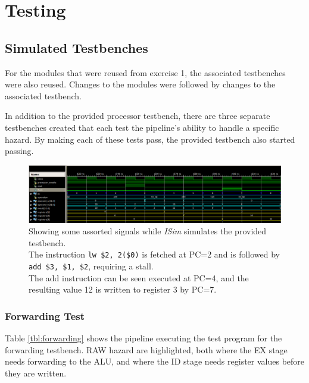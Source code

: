 \section{Testing}
\subsection{Simulated Testbenches}
For the modules that were reused from exercise 1,
the associated testbenches were also reused.
Changes to the modules were followed by changes to the associated testbench.

In addition to the provided processor testbench,
there are three separate testbenches created that each test the pipeline's ability to handle a specific hazard.
By making each of these tests pass, the provided testbench also started passing.

\begin{figure}[h]
    \centering
    \includegraphics[width=\textwidth]{img/isim}
    \caption{Showing some assorted signals while \textit{ISim} simulates the provided testbench.\\
        The instruction \texttt{lw \$2, 2(\$0)} is fetched at PC=2 and is followed by \texttt{add \$3, \$1, \$2},
        requiring a stall.\\
        The add instruction can be seen executed at PC=4,
         and the resulting value 12 is written to register 3 by PC=7.
    }
    \label{fig:isim}
\end{figure}

\subsubsection{Forwarding Test}
Table \ref{tbl:forwarding} shows the pipeline executing the test program for the forwarding testbench.
RAW hazard are highlighted,
both where the EX stage needs forwarding to the ALU,
and where the ID stage needs register values before they are written.


